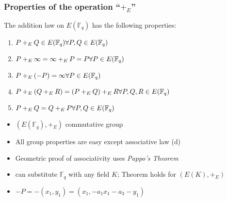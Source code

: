 \documentclass[10pt,handout]{beamer} %
\newcommand{\Q}{\mathbb Q}
\newcommand{\F}{\mathbb F}
\newcommand{\C}{\mathbb C}
\theoremstyle{definition}
\begin{document}
\begin{frame}
\frametitle{Properties of the operation ``$+_E$''}

\begin{Theorem}
 The addition law on $E(\F_q)$ has the following
properties:
\begin{enumerate}[<+-| alert@+>][(a)]
 \item $P+_EQ\in E(\F_q)\hfill\forall P,Q\in E(\F_q)$
 \item  $P+_E\infty=\infty+_E P=P\hfill\forall P\in E(\F_q)$
 \item  $P+_E(-P)=\infty\hfill\forall P\in E(\F_q)$
 \item  $P+_E(Q +_E R)=(P+_E Q)+_E R\hfill\forall P,Q,R\in E(\F_q)$
 \item  $P+_E Q=Q +_E P\hfill\forall P,Q\in E(\F_q)$
\end{enumerate}
 \end{Theorem}\pause

\begin{itemize}[<+-| alert@+>]
 \item $\left(E(\F_q),+_E\right)$  \alert{commutative group}
 \item All group properties are easy except \alert{associative law (d)}
 \item Geometric proof of associativity uses \emph{Pappo's Theorem}
 \item can substitute $\F_q$ with any field $K$; Theorem holds for $\left(E(K),+_E\right)$
\item $-P=-(x_1,y_1)=(x_1,-a_1x_1-a_3-y_1)$
\end{itemize}
\end{frame}
\end{document}
